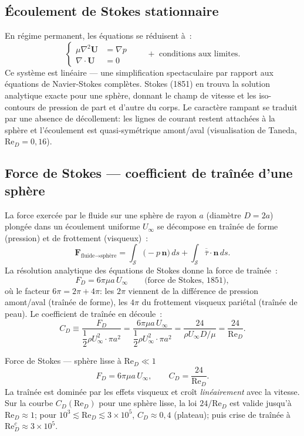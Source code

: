 \documentclass[11pt,a4paper]{report}
\newcommand{\ten}[1]{\overline{\overline{#1}}}   %
\begin{document}
\subsection{\'Ecoulement de Stokes stationnaire}

En r\'egime permanent, les \'equations se r\'eduisent \`a~:
\[
  \left\{\begin{aligned}
    \mu\nabla^2\bm{U} &= \nabla p \\[4pt]
    \nabla\cdot\bm{U} &= 0
  \end{aligned}\right.
  \qquad + \text{ conditions aux limites.}
\]
Ce syst\`eme est lin\'eaire --- une simplification spectaculaire par rapport aux
\'equations de Navier-Stokes compl\`etes. Stokes (1851) en trouva la solution analytique
exacte pour une sph\`ere, donnant le champ de vitesse et les iso-contours de pression
de part et d'autre du corps. Le caract\`ere rampant se traduit par une absence de
d\'ecollement: les lignes de courant restent attach\'ees \`a la sph\`ere et l'\'ecoulement
est quasi-sym\'etrique amont/aval (visualisation de Taneda, $\mathrm{Re}_D = 0{,}16$).

\subsection{Force de Stokes --- coefficient de tra\^in\'ee d'une sph\`ere}

La force exerc\'ee par le fluide sur une sph\`ere de rayon $a$ (diam\`etre $D=2a$)
plong\'ee dans un \'ecoulement uniforme $U_\infty$ se d\'ecompose en tra\^in\'ee de
forme (pression) et de frottement (visqueux)~:
\[
  \bm{F}_{\text{fluide}\to\text{sph\`ere}}
  = \int_{\mathcal{S}} \bigl(-p\,\bm{n}\bigr)\,ds
  + \int_{\mathcal{S}} \ten{\tau}\cdot\bm{n}\,ds.
\]
La r\'esolution analytique des \'equations de Stokes donne la force de tra\^in\'ee~:
\[
  F_D = 6\pi\mu a\, U_\infty
  \qquad\text{(force de Stokes, 1851)},
\]
o\`u le facteur $6\pi = 2\pi + 4\pi$: les $2\pi$ viennent de la diff\'erence de pression
amont/aval (tra\^in\'ee de forme), les $4\pi$ du frottement visqueux pari\'etal (tra\^in\'ee
de peau). Le coefficient de tra\^in\'ee en d\'ecoule~:
\[
  C_D \equiv \frac{F_D}{\dfrac{1}{2}\rho U_\infty^2 \cdot \pi a^2}
  = \frac{6\pi\mu a\, U_\infty}{\dfrac{1}{2}\rho U_\infty^2 \cdot \pi a^2}
  = \frac{24}{\rho U_\infty D/\mu}
  = \frac{24}{\mathrm{Re}_D}.
\]

\begin{importantbox}{Force de Stokes --- sph\`ere lisse \`a $\mathrm{Re}_D \ll 1$}
\[
  F_D = 6\pi\mu a\, U_\infty,
  \qquad
  C_D = \dfrac{24}{\mathrm{Re}_D}.
\]
La tra\^in\'ee est domin\'ee par les effets visqueux et cro\^it \emph{lin\'eairement}
avec la vitesse. Sur la courbe $C_D(\mathrm{Re}_D)$ pour une sph\`ere lisse, la loi
$24/\mathrm{Re}_D$ est valide jusqu'\`a $\mathrm{Re}_D \approx 1$; pour
$10^3 \lesssim \mathrm{Re}_D \lesssim 3\times10^5$, $C_D \approx 0{,}4$ (plateau);
puis crise de tra\^in\'ee \`a $\mathrm{Re}_D^c \approx 3\times10^5$.
\end{importantbox}
\end{document}
